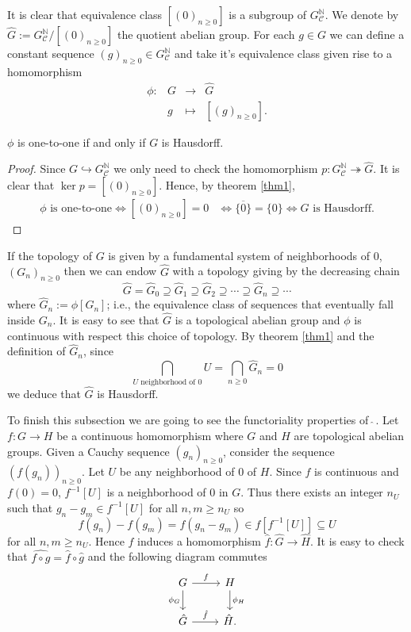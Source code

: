 It is clear that equivalence class $[(0)_{n\geq 0}]$ is a subgroup of $G^\mathbb N_\mathcal C$. We denote by $\hat G:=G^\mathbb N_\mathcal C/[(0)_{n\geq 0}]$ the quotient abelian group. For each $g\in G$ we can define a constant sequence $(g)_{n\geq 0}\in G^\mathbb N_\mathcal C$ and take it's equivalence class given rise to a homomorphism
\[
\begin{matrix}
\phi\colon & G&\to & \hat G \\
& g &\mapsto & [(g)_{n\geq 0}].
\end{matrix}
\]
\begin{thm}\label{Hausdorff}
    $\phi$ is one-to-one if and only if $G$ is Hausdorff.
\end{thm}
\begin{proof}
        Since $G\hookrightarrow G^\mathbb N_\mathcal C$ we only need to check the homomorphism $p\colon G^\mathbb N_\mathcal C\twoheadrightarrow \hat G$. It is clear that $\ker p=[(0)_{n\geq 0}]$. Hence, by theorem \ref{thm1},
        \begin{align*}
            \phi \text{ is one-to-one}\iff[(0)_{n\geq 0}]=0 &\iff \overline{\{0\}}=\{0\} \iff G \text{ is Hausdorff}.
        \end{align*}
\end{proof}

If the topology of $G$ is given by a fundamental system of neighborhoods of $0$, $(G_n)_{n\geq 0}$ then we can endow $\hat G$ with a topology giving by the decreasing chain
\[
\hat G=\hat G_0\supseteq \hat G_1\supseteq \hat G_2\supseteq \cdots \supseteq \hat G_n\supseteq \cdots
\]
where $\hat G_n:=\phi[G_n]$; i.e., the equivalence class of sequences that eventually fall inside $G_n$. It is easy to see that $\hat G$ is a topological abelian group and $\phi$ is continuous with respect this choice of topology. By theorem \ref{thm1} and the definition of $\hat G_n$, since
\[
\bigcap_{U\text{ neighborhood of 0}} U=\bigcap_{n\geq 0} \hat G_n=0 
\]
we deduce that $\hat G$ is Hausdorff.

To finish this subsection we are going to see the functoriality properties of $\,\hat{}\,$. Let $f\colon G\to H$ be a continuous homomorphism where $G$ and $H$ are topological abelian groups. Given a Cauchy sequence $(g_n)_{n\geq 0}$, consider the sequence $(f(g_n))_{n\geq 0}$. Let $U$ be any neighborhood of $0$ of $H$. Since $f$ is continuous and $f(0)=0$, $f^{-1}[U]$ is a neighborhood of $0$ in $G$. Thus there exists an integer $n_U$ such that $g_n-g_m\in f^{-1}[U]$ for all $n,m\geq n_U$ so 
\[
f(g_n)-f(g_m)=f(g_n-g_m)\in f[f^{-1}[U]]\subseteq U
\]
for all $n,m\geq n_U$. Hence $f$ induces a homomorphism $\hat f\colon \hat G\to\hat H$. It is easy to check that $\widehat{f\circ g}=\hat f\circ \hat g$ and the following diagram commutes
\[
\begin{tikzcd}
    G \ar[r, "f"] \ar[d, "\phi_G"']& H \ar[d, "\phi_H"]\\
    \hat G \ar[r, "\hat f"] & \hat H.
\end{tikzcd}
\]
 
